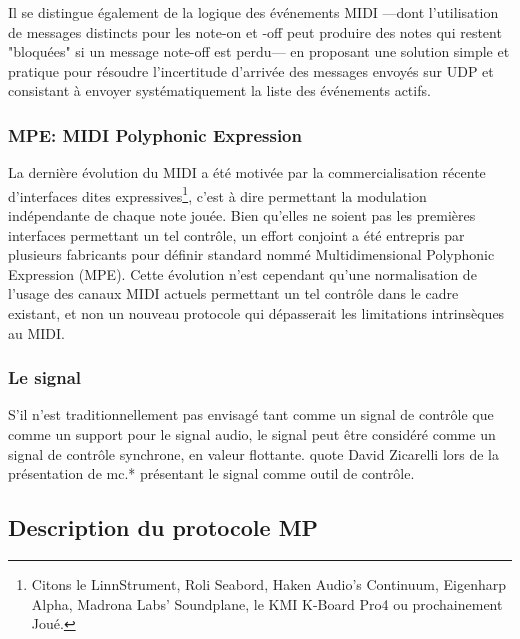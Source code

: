 Il se distingue également de la logique des événements \gls{MIDI} —dont l'utilisation de messages distincts pour les note-on et -off peut produire des notes qui restent "bloquées" si un message note-off est perdu— en proposant une solution simple et pratique pour résoudre l'incertitude d'arrivée des messages envoyés sur UDP et consistant à envoyer systématiquement la liste des événements actifs.

\subsubsection{\gls{MPE}: MIDI Polyphonic Expression}
La dernière évolution du \gls{MIDI} a été motivée par la commercialisation récente d'interfaces dites expressives\footnote{ Citons le LinnStrument, Roli Seabord, Haken Audio’s Continuum, Eigenharp Alpha, Madrona Labs’ Soundplane, le KMI K-Board Pro4 ou prochainement Joué.}, c'est à dire permettant la modulation indépendante de chaque note jouée. Bien qu'elles ne soient pas les premières interfaces permettant un tel contrôle, un effort conjoint a été entrepris par plusieurs fabricants pour définir standard nommé Multidimensional Polyphonic Expression (\gls{MPE}). Cette évolution n'est cependant qu'une normalisation de l'usage des canaux \gls{MIDI} actuels permettant un tel contrôle dans le cadre existant, et non un nouveau protocole qui dépasserait les limitations intrinsèques au \gls{MIDI}.

\subsubsection{Le signal}
S'il n'est traditionnellement pas envisagé tant comme un signal de contrôle que comme un support pour le signal audio, le signal peut être considéré comme un signal de contrôle synchrone, en valeur flottante. quote David Zicarelli lors de la présentation de mc.* présentant le signal comme outil de contrôle.


\subsection{Description du protocole MP}

